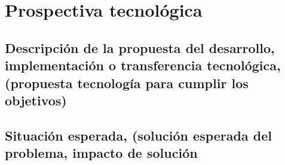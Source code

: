 \chapter{Prospectiva tecnológica}

\section{Descripción de la propuesta del desarrollo, implementación o transferencia tecnológica, (propuesta tecnología para cumplir los objetivos)}

\section{Situación esperada, (solución esperada del problema, impacto de solución}